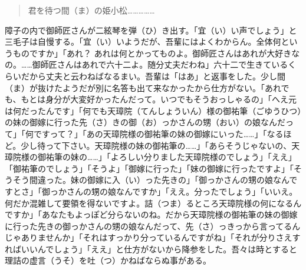 \documentclass{book}
\begin{document}
\blockquote{君を待つ間（ま）の姫小松\ldots{}\ldots{}\ldots{}\ldots{}\ldots{}}

障子の内で御師匠さんが二絃琴を弾（ひ）き出す。「宜（い）い声でしょう」と三毛子は自慢する。「宜（い）いようだが、吾輩にはよくわからん。全体何というものですか」「あれ？ あれは何とかってものよ。御師匠さんはあれが大好きなの。\ldots{}\ldots{}御師匠さんはあれで六十二よ。随分丈夫だわね」六十二で生きているくらいだから丈夫と云わねばなるまい。吾輩は「はあ」と返事をした。少し間（ま）が抜けたようだが別に名答も出て来なかったから仕方がない。「あれでも、もとは身分が大変好かったんだって。いつでもそうおっしゃるの」「へえ元は何だったんです」「何でも天璋院（てんしょういん）様の御祐筆（ごゆうひつ）の妹の御嫁に行った先（さ）きの御（お）っかさんの甥（おい）の娘なんだって」「何ですって？」「あの天璋院様の御祐筆の妹の御嫁にいった\ldots{}\ldots{}」「なるほど。少し待って下さい。天璋院様の妹の御祐筆の\ldots{}\ldots{}」「あらそうじゃないの、天璋院様の御祐筆の妹の\ldots{}\ldots{}」「よろしい分りました天璋院様のでしょう」「ええ」「御祐筆のでしょう」「そうよ」「御嫁に行った」「妹の御嫁に行ったですよ」「そうそう間違った。妹の御嫁に入（い）った先きの」「御っかさんの甥の娘なんですとさ」「御っかさんの甥の娘なんですか」「ええ。分ったでしょう」「いいえ。何だか混雑して要領を得ないですよ。詰（つま）るところ天璋院様の何になるんですか」「あなたもよっぽど分らないのね。だから天璋院様の御祐筆の妹の御嫁に行った先きの御っかさんの甥の娘なんだって、先（さ）っきっから言ってるんじゃありませんか」「それはすっかり分っているんですがね」「それが分りさえすればいいんでしょう」「ええ」と仕方がないから降参をした。吾々は時とすると理詰の虚言（うそ）を吐（つ）かねばならぬ事がある。
\end{document}
